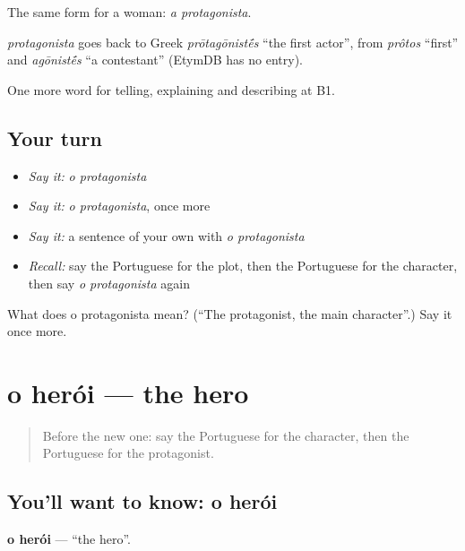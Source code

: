 The same form for a woman: \emph{a protagonista}.

\begin{cousinweb}
\emph{protagonista} goes back to Greek \emph{prōtagōnist\'{\={e}}s} \textquotedblleft{}the first actor\textquotedblright{}, from \emph{prôtos} \textquotedblleft{}first\textquotedblright{} and \emph{agōnist\'{\={e}}s} \textquotedblleft{}a contestant\textquotedblright{} (EtymDB has no entry).
\end{cousinweb}

\begin{grammarlens}[title={What you've built}]
One more word for telling, explaining and describing at B1.
\end{grammarlens}

\subsection*{Your turn}
\begin{itemize}
\raggedright
  \item \emph{Say it:} \emph{o protagonista}
  \item \emph{Say it:} \emph{o protagonista}, once more
  \item \emph{Say it:} a sentence of your own with \emph{o protagonista}
  \item \emph{Recall:} say the Portuguese for the plot, then the Portuguese for the character, then say \emph{o protagonista} again
\end{itemize}

\begin{tcolorbox}[breakable,colback=teal!4,colframe=teal!35!black,title={Before you move on}]
What does o protagonista mean? (\textquotedblleft{}The protagonist, the main character\textquotedblright{}.) Say it once more.
\end{tcolorbox}
\section[o herói]{o herói — the hero}

\label{lesson:PT-C325-heroi}



\begin{quote}
Before the new one: say the Portuguese for the character, then the Portuguese for the protagonist.
\end{quote}

\subsection*{You'll want to know: o herói}
\textbf{o herói} — \textquotedblleft{}the hero\textquotedblright{}.

